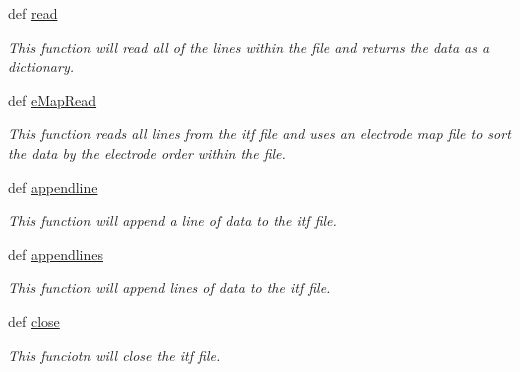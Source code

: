 \begin{DoxyCompactItemize}
def \hyperlink{class_chassis_8git_1_1itf_parser_1_1itf_parser_a8d64e3f53ad0cb74ad10da1f6be331b0}{read}
\begin{DoxyCompactList}\small\item\em This function will read all of the lines within the file and returns the data as a dictionary. \end{DoxyCompactList}\item 
def \hyperlink{class_chassis_8git_1_1itf_parser_1_1itf_parser_aebf2240abfec136b866ebafac1923c67}{e\-Map\-Read}
\begin{DoxyCompactList}\small\item\em This function reads all lines from the itf file and uses an electrode map file to sort the data by the electrode order within the file. \end{DoxyCompactList}\item 
def \hyperlink{class_chassis_8git_1_1itf_parser_1_1itf_parser_a4d4fc8b1f33a7b919e4be2dc02247012}{appendline}
\begin{DoxyCompactList}\small\item\em This function will append a line of data to the itf file. \end{DoxyCompactList}\item 
def \hyperlink{class_chassis_8git_1_1itf_parser_1_1itf_parser_ab7961ca676d903be12603c2d29a86390}{appendlines}
\begin{DoxyCompactList}\small\item\em This function will append lines of data to the itf file. \end{DoxyCompactList}\item 
def \hyperlink{class_chassis_8git_1_1itf_parser_1_1itf_parser_aa3dae5b08b74c6d65c2a8b94cda7e075}{close}
\begin{DoxyCompactList}\small\item\em This funciotn will close the itf file. \end{DoxyCompactList}\end{DoxyCompactItemize}
